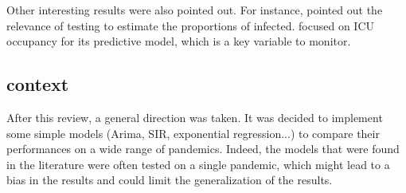 Other interesting results were also pointed out. 
For instance, \cite{hult2020estimates} pointed out the relevance of testing to estimate the proportions of infected. 
\cite{sjodin2020covid} focused on ICU occupancy for its predictive model, which is a key variable to monitor. 

\subsection{context}

After this review, a general direction was taken. 
It was decided to implement some simple models (Arima, SIR, exponential regression...) to compare their performances on a wide range of pandemics. 
Indeed, the models that were found in the literature were often tested on a single pandemic, which might lead to a bias in the results and could limit the generalization of the results.
